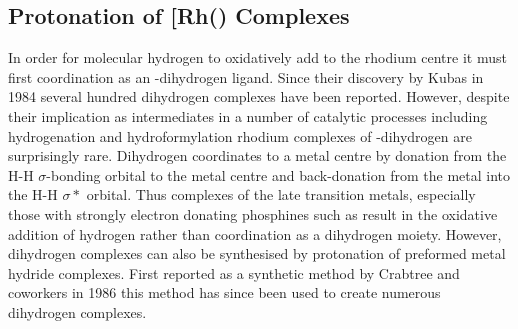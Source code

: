 
\subsection{Protonation of \texorpdfstring{[Rh(\tButhixantphos)\ce{Cl(H)2]}} R Complexes}

In order for molecular hydrogen to oxidatively add to the rhodium centre it must first coordination as an -dihydrogen ligand.  Since their discovery by Kubas in 1984\cite{Kubas1984} several hundred dihydrogen complexes have been reported.\cite{McGrady2003}  However, despite their implication as intermediates in a number of catalytic processes including hydrogenation and hydroformylation rhodium complexes of -dihydrogen are surprisingly rare.  Dihydrogen coordinates to a metal centre by donation from the H-H $\sigma$-bonding orbital to the metal centre and back-donation from the metal into the H-H $\sigma*$ orbital.  Thus complexes of the late transition metals, especially those with strongly electron donating phosphines such as \tBuxantphos{} result in the oxidative addition of hydrogen rather than coordination as a dihydrogen moiety.  However, dihydrogen complexes can also be synthesised by protonation of preformed metal hydride complexes.  First reported as a synthetic method by Crabtree and coworkers in 1986\cite{Crabtree1986} this method has since been used to create numerous dihydrogen complexes\cite{Janak2004, Oldham1997, Pons2004, Heinekey1993}.


